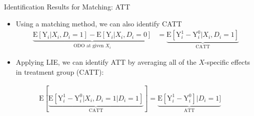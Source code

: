 \documentclass[hyperref={pdfpagelabels=false}]{beamer}
\begin{document}
\begin{frame}{Identification Results for Matching: ATT}
	\begin{itemize}
		
		\item Using a matching method, we can also identify CATT
		\vspace{0.2cm}
		\begin{equation*}
			\begin{aligned}
					\underbrace{\mathrm{E}[\mathrm{Y}_{i}|X_{i},D_{i}=1] - \mathrm{E}[\mathrm{Y}_{i}|X_{i},D_{i}=0]}_{\text{ODO at given $X_{i}$}}  &= \underbrace{\mathrm{E}[\mathrm{Y}^{1}_{i}-\mathrm{Y}^{0}_{i}|X_{i},D_i=1]}_{\text{CATT}}
			\end{aligned}
		\end{equation*}	
		
		
		\item Applying LIE, we can identify ATT by averaging all of the $X$-specific effects in treatment group (CATT):
		\vspace{0.2cm}
		
	\end{itemize}
	\begin{equation*}
		\begin{aligned}
			\mathrm{E}[\underbrace{\mathrm{E}[\mathrm{Y}^{1}_{i}-\mathrm{Y}^{0}_{i}|X_{i},D_i=1 |D_i=1]}_{\text{CATT}}] 
			=\underbrace{\mathrm{E}[\mathrm{Y}^{1}_{i}-\mathrm{Y}^{0}_{i}]|D_i=1]}_{\text{ATT}}
			
		\end{aligned}
	\end{equation*}	
	
\end{frame}
\end{document}
